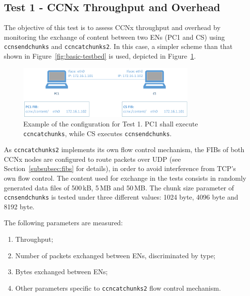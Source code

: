 \subsection{Test 1 - CCNx Throughput and Overhead}
\label{subsec:test-throughput-overhead}

The objective of this test is to assess CCNx throughput and overhead by monitoring 
the exchange of content between two ENs (PC1 and CS) using 
\verb+ccnsendchunks+ and \verb+ccncatchunks2+. In this case, a 
simpler scheme than that shown in Figure~\ref{fig:basic-testbed} is used, 
depicted in Figure~\ref{fig:test-1-1}.\vertbreak

\begin{figure}[h!]

    \centering
    \includegraphics[width=0.80\textwidth]{figures/diag3.png}
    \cprotect\caption{Example of the configuration for Test 1. PC1 shall 
            execute \verb?ccncatchunks?, while CS executes \verb?ccnsendchunks?.}
    \label{fig:test-1-1}

\end{figure}

As \verb+ccncatchunks2+ implements its own flow control mechanism, the FIBs of 
both CCNx nodes are configured to route packets over UDP (see 
Section~\ref{subsubsec:fibs} for details), in order to avoid interference 
from TCP's own flow control. The content used for 
exchange in the tests consists in randomly generated data files of 500\,kB, 
5\,MB and 50\,MB. The chunk size parameter of \verb+ccnsendchunks+ is tested 
under three different values: 1024 byte, 4096 byte and 8192 byte.\vertbreak

The following parameters are measured:

\begin{enumerate}
    \item Throughput;
    \item Number of packets exchanged between ENs, discriminated by type;
    \item Bytes exchanged between ENs;
    \item Other parameters specific to \verb+ccncatchunks2+ flow control 
        mechanism.
\end{enumerate} 

